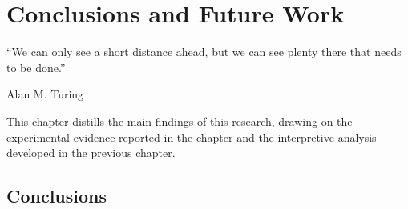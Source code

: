 \chapter{Conclusions and Future Work}
\epigraph{``We can only see a short distance ahead, but we can see plenty there that needs to be done.''}{\vspace{10pt}Alan M. Turing}
\label{chapter:conclusions-fw}

\newpage

This chapter distills the main findings of this research, drawing on the experimental evidence reported in the  chapter and the interpretive analysis developed in the previous chapter.

\section{Conclusions}

